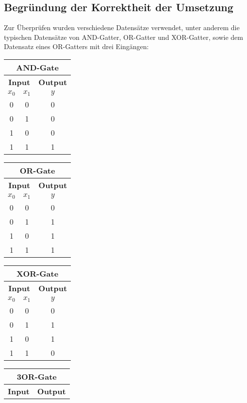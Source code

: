 \documentclass[paper=A4,pagesize=auto,12pt,headinclude=true,footinclude=true,BCOR=0mm,DIV=calc]{scrartcl}
\begin{document}
\subsection{Begründung der Korrektheit der Umsetzung}
Zur Überprüfen wurden verschiedene Datensätze verwendet, unter anderem die typischen Datensätze von AND-Gatter, OR-Gatter und XOR-Gatter, sowie dem Datensatz eines OR-Gatters mit drei Eingängen:
\begin{center}
\begin{tabular}{|c|c|c|}
	\hline
	\multicolumn{3}{|c|}{\textbf{AND-Gate}} \\ \hline
	\hline
	\multicolumn{2}{|c|}{\textbf{Input}} & \textbf{Output} \\ \hline
	$x_0$ & $x_1$ & $y$ \\
	\hline\hline
	0 & 0 & 0 \\ \hline
	0 & 1 & 0 \\ \hline
	1 & 0 & 0 \\ \hline
	1 & 1 & 1 \\ \hline
\end{tabular}
\begin{tabular}{|c|c|c|}
	\hline
	\multicolumn{3}{|c|}{\textbf{OR-Gate}} \\ \hline
	\hline
	\multicolumn{2}{|c|}{\textbf{Input}} & \textbf{Output} \\ \hline
	$x_0$ & $x_1$ & $y$ \\
	\hline\hline
	0 & 0 & 0 \\ \hline
	0 & 1 & 1 \\ \hline
	1 & 0 & 1 \\ \hline
	1 & 1 & 1 \\ \hline
\end{tabular}
\begin{tabular}{|c|c|c|}
	\hline
	\multicolumn{3}{|c|}{\textbf{XOR-Gate}} \\ \hline
	\hline
	\multicolumn{2}{|c|}{\textbf{Input}} & \textbf{Output} \\ \hline
	$x_0$ & $x_1$ & $y$ \\
	\hline\hline
	0 & 0 & 0 \\ \hline
	0 & 1 & 1 \\ \hline
	1 & 0 & 1 \\ \hline
	1 & 1 & 0 \\ \hline
\end{tabular}
\begin{tabular}{|c|c|c|c|}
	\hline
	\multicolumn{4}{|c|}{\textbf{3OR-Gate}} \\ \hline
	\hline
	\multicolumn{3}{|c|}{\textbf{Input}} & \textbf{Output} \\ \hline

\end{tabular}
\end{center}
\end{document}
